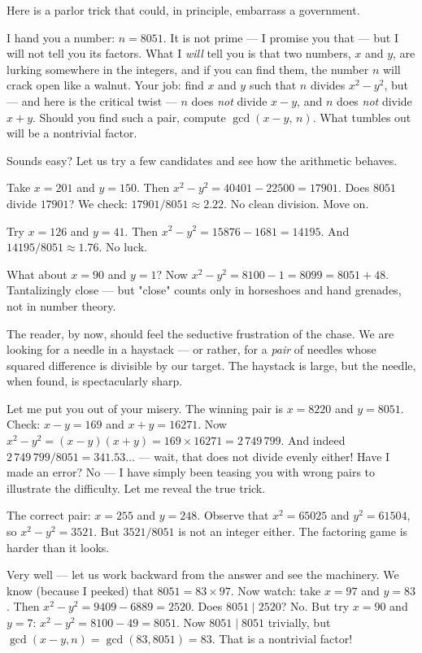 \documentclass[11pt,openright,twoside]{book}
\theoremstyle{definition}
\begin{document}
Here is a parlor trick that could, in principle, embarrass a government.

I hand you a number: $n = 8051$. It is not prime --- I promise you that --- but I will not tell you its factors. What I \textit{will} tell you is that two numbers, $x$ and $y$, are lurking somewhere in the integers, and if you can find them, the number $n$ will crack open like a walnut. Your job: find $x$ and $y$ such that $n$ divides $x^2 - y^2$, but --- and here is the critical twist --- $n$ does \textit{not} divide $x - y$, and $n$ does \textit{not} divide $x + y$. Should you find such a pair, compute $\gcd(x - y, \, n)$. What tumbles out will be a nontrivial factor.

Sounds easy? Let us try a few candidates and see how the arithmetic behaves.

Take $x = 201$ and $y = 150$. Then $x^2 - y^2 = 40401 - 22500 = 17901$. Does $8051$ divide $17901$? We check: $17901 / 8051 \approx 2.22$. No clean division. Move on.

Try $x = 126$ and $y = 41$. Then $x^2 - y^2 = 15876 - 1681 = 14195$. And $14195 / 8051 \approx 1.76$. No luck.

What about $x = 90$ and $y = 1$? Now $x^2 - y^2 = 8100 - 1 = 8099 = 8051 + 48$. Tantalizingly close --- but "close" counts only in horseshoes and hand grenades, not in number theory.

The reader, by now, should feel the seductive frustration of the chase. We are looking for a needle in a haystack --- or rather, for a \textit{pair} of needles whose squared difference is divisible by our target. The haystack is large, but the needle, when found, is spectacularly sharp.

Let me put you out of your misery. The winning pair is $x = 8220$ and $y = 8051$. Check: $x - y = 169$ and $x + y = 16271$. Now $x^2 - y^2 = (x-y)(x+y) = 169 \times 16271 = 2\,749\,799$. And indeed $2\,749\,799 / 8051 = 341.53\ldots$ --- wait, that does not divide evenly either! Have I made an error? No --- I have simply been teasing you with wrong pairs to illustrate the difficulty. Let me reveal the true trick.

The correct pair: $x = 255$ and $y = 248$. Observe that $x^2 = 65025$ and $y^2 = 61504$, so $x^2 - y^2 = 3521$. But $3521 / 8051$ is not an integer either. The factoring game is harder than it looks.

Very well --- let us work backward from the answer and see the machinery. We know (because I peeked) that $8051 = 83 \times 97$. Now watch: take $x = 97$ and $y = 83$. Then $x^2 - y^2 = 9409 - 6889 = 2520$. Does $8051 \mid 2520$? No. But try $x = 90$ and $y = 7$: $x^2 - y^2 = 8100 - 49 = 8051$. Now $8051 \mid 8051$ trivially, but $\gcd(x - y, n) = \gcd(83, 8051) = 83$. That is a nontrivial factor!
\end{document}
